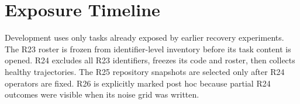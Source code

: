 \documentclass[10pt]{article}
\begin{document}
\section{Exposure Timeline}
Development uses only tasks already exposed by earlier recovery experiments. The R23 roster is frozen from identifier-level inventory before its task content is opened. R24 excludes all R23 identifiers, freezes its code and roster, then collects healthy trajectories. The R25 repository snapshots are selected only after R24 operators are fixed. R26 is explicitly marked post hoc because partial R24 outcomes were visible when its noise grid was written.
\end{document}
